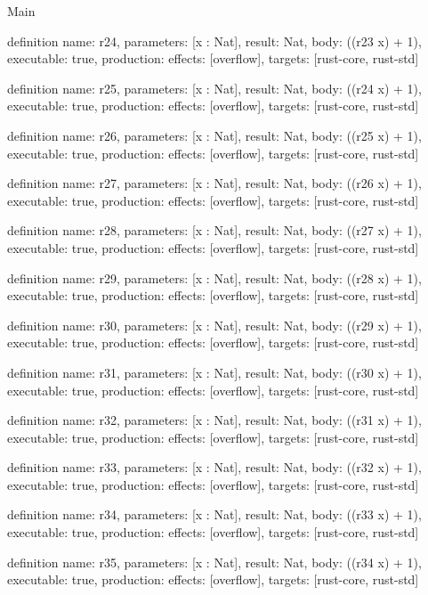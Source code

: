 \begin{lexlean}{Main}
\begin{semanticmodule}
definition{
  name: r24,
  parameters: [x : Nat],
  result: Nat,
  body: ((r23 x) + 1),
  executable: true,
  production: {effects: [overflow], targets: [rust-core, rust-std]}
}

definition{
  name: r25,
  parameters: [x : Nat],
  result: Nat,
  body: ((r24 x) + 1),
  executable: true,
  production: {effects: [overflow], targets: [rust-core, rust-std]}
}

definition{
  name: r26,
  parameters: [x : Nat],
  result: Nat,
  body: ((r25 x) + 1),
  executable: true,
  production: {effects: [overflow], targets: [rust-core, rust-std]}
}

definition{
  name: r27,
  parameters: [x : Nat],
  result: Nat,
  body: ((r26 x) + 1),
  executable: true,
  production: {effects: [overflow], targets: [rust-core, rust-std]}
}

definition{
  name: r28,
  parameters: [x : Nat],
  result: Nat,
  body: ((r27 x) + 1),
  executable: true,
  production: {effects: [overflow], targets: [rust-core, rust-std]}
}

definition{
  name: r29,
  parameters: [x : Nat],
  result: Nat,
  body: ((r28 x) + 1),
  executable: true,
  production: {effects: [overflow], targets: [rust-core, rust-std]}
}

definition{
  name: r30,
  parameters: [x : Nat],
  result: Nat,
  body: ((r29 x) + 1),
  executable: true,
  production: {effects: [overflow], targets: [rust-core, rust-std]}
}

definition{
  name: r31,
  parameters: [x : Nat],
  result: Nat,
  body: ((r30 x) + 1),
  executable: true,
  production: {effects: [overflow], targets: [rust-core, rust-std]}
}

definition{
  name: r32,
  parameters: [x : Nat],
  result: Nat,
  body: ((r31 x) + 1),
  executable: true,
  production: {effects: [overflow], targets: [rust-core, rust-std]}
}

definition{
  name: r33,
  parameters: [x : Nat],
  result: Nat,
  body: ((r32 x) + 1),
  executable: true,
  production: {effects: [overflow], targets: [rust-core, rust-std]}
}

definition{
  name: r34,
  parameters: [x : Nat],
  result: Nat,
  body: ((r33 x) + 1),
  executable: true,
  production: {effects: [overflow], targets: [rust-core, rust-std]}
}

definition{
  name: r35,
  parameters: [x : Nat],
  result: Nat,
  body: ((r34 x) + 1),
  executable: true,
  production: {effects: [overflow], targets: [rust-core, rust-std]}
}


\end{semanticmodule}
\end{lexlean}
